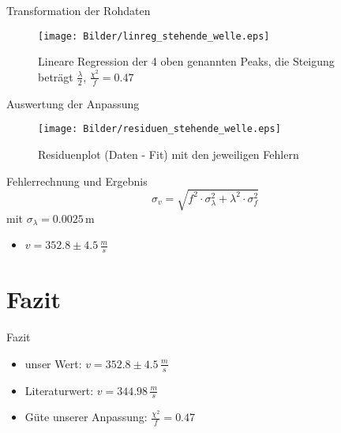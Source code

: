 \documentclass[11pt]{beamer}
\begin{document}
\begin{frame}{Transformation der Rohdaten}
\begin{figure}[H]
\centering
\texttt{[image: Bilder/linreg\_stehende\_welle.eps]}
\caption{Lineare Regression der 4 oben genannten Peaks, die Steigung beträgt $\frac{\lambda}{2}$, $\frac{\chi^2}{f} = 0.47$}
\end{figure}
\end{frame}

\begin{frame}{Auswertung der Anpassung}
\begin{figure}[H]
\centering
\texttt{[image: Bilder/residuen\_stehende\_welle.eps]}
\caption{Residuenplot (Daten - Fit) mit den jeweiligen Fehlern}
\end{figure}
\end{frame}

\begin{frame}{Fehlerrechnung und Ergebnis}
\begin{equation}
\sigma_{v} = \sqrt{f^2\cdot\sigma_{\lambda}^2 + \lambda^2\cdot\sigma_{f}^2}
\end{equation}
mit $\sigma_{\lambda} = 0.0025\,$m 
\begin{itemize}
\item $v = 352.8 \pm 4.5\,\frac{m}{s}$ 
\end{itemize}
\end{frame}

\section{Fazit}
\begin{frame}{Fazit}
\begin{itemize}
\item unser Wert: $v = 352.8 \pm 4.5\,\frac{m}{s}$ 
\item Literaturwert: $v = 344.98\,\frac{m}{s}$
\item Güte unserer Anpassung: $\frac{\chi^2}{f} = 0.47$
\end{itemize}
\end{frame}
\end{document}
